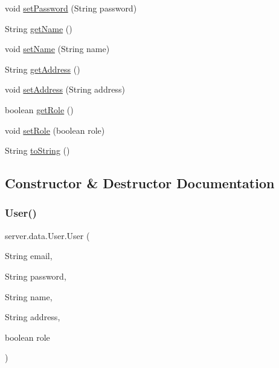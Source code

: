 \begin{DoxyCompactItemize}
void \hyperlink{classserver_1_1data_1_1_user_a694f243c23ff0620fb683b56f000efc2}{set\+Password} (String password)
\item 
String \hyperlink{classserver_1_1data_1_1_user_ab93c00a3d4afed35078368042d22dcbf}{get\+Name} ()
\item 
void \hyperlink{classserver_1_1data_1_1_user_aab7b2fc87e25728de4b294c9e70811c2}{set\+Name} (String name)
\item 
String \hyperlink{classserver_1_1data_1_1_user_a79d0f524fce79626a9b420b6bb4a8a24}{get\+Address} ()
\item 
void \hyperlink{classserver_1_1data_1_1_user_a7c6d27100b4dbe56de5a9bd4efeb3e13}{set\+Address} (String address)
\item 
boolean \hyperlink{classserver_1_1data_1_1_user_adecb15490622c3c9b813c7c2ebe1616b}{get\+Role} ()
\item 
void \hyperlink{classserver_1_1data_1_1_user_af2ed33ffa1d69585d758713f77b5b079}{set\+Role} (boolean role)
\item 
String \hyperlink{classserver_1_1data_1_1_user_a003500665bb10c335b8d14c1c8fc511e}{to\+String} ()
\end{DoxyCompactItemize}


\subsection{Constructor \& Destructor Documentation}
\mbox{\label{classserver_1_1data_1_1_user_a7167eb7271a1481528efbb6d8f825c76}} 
\subsubsection{\texorpdfstring{User()}{User()}\hspace{0.1cm}{\footnotesize\ttfamily [1/2]}}
{\footnotesize\ttfamily server.\+data.\+User.\+User (\begin{DoxyParamCaption}\item[{String}]{email,  }\item[{String}]{password,  }\item[{String}]{name,  }\item[{String}]{address,  }\item[{boolean}]{role }\end{DoxyParamCaption})}


